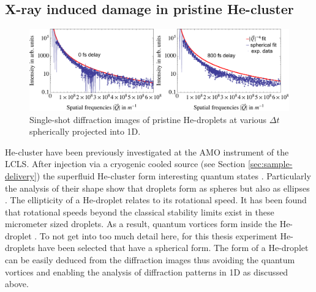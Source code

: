 \subsection{X-ray induced damage in pristine He-cluster}\label{sec:He-data-real}
%
\begin{figure}
	\centering
		\includegraphics[width=1.00\textwidth]{images/results/He-diffraction-patterns.pdf}
	\caption[Single-shot diffraction images of He-droplets at different time delays]{Single-shot diffraction images of pristine He-droplets at various $\Delta t$ spherically projected into 1D.}
	\label{fig:He-diffraction-patterns}
\end{figure}
%
He-cluster have been previously investigated at the AMO instrument of the LCLS. After injection via a cryogenic cooled source (see Section \ref{sec:sample-delivery}) the superfluid He-cluster \cite{Gomez-2011-JCP} form interesting quantum states \cite{Toennies-2004-ACIE,Gomez-2012-PRL}. Particularly the analysis of their shape show that droplets form as spheres but also as ellipses \cite{Bernado-2017-PRB}. The ellipticity of a He-droplet relates to its rotational speed. It has been found that rotational speeds beyond the classical stability limits exist in these micrometer sized droplets. As a result, quantum vortices form inside the He-droplet \cite{Gomez-2014-Science}. To not get into too much detail here, for this thesis experiment He-droplets have been selected that have a spherical form. The form of a He-droplet can be easily deduced from the diffraction images thus avoiding the quantum vortices and enabling the analysis of diffraction patterns in 1D as discussed above.
%
